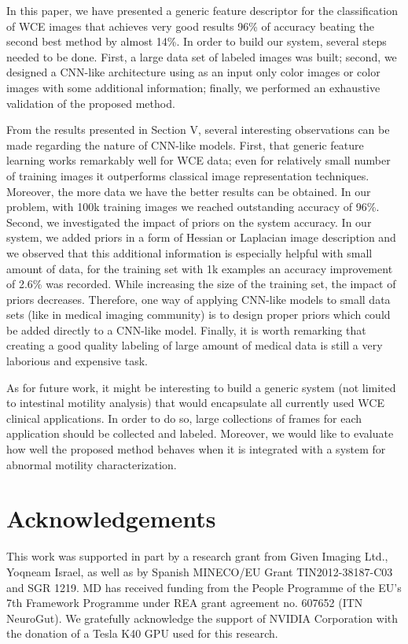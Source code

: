 \documentclass[review,12pt,3p]{elsarticle}
\begin{document}
In this paper, we have presented a generic feature descriptor for the classification of WCE images that achieves very good results 96\% of accuracy beating the second best method by almost 14\%. In order to build our system, several steps needed to be done. First, a large data set of labeled images was built; second, we designed a CNN-like architecture using as an input only color images or color images with some additional information; finally, we performed an exhaustive validation of the proposed method. 

From the results presented in Section V, several interesting observations can be made regarding the nature of CNN-like models. First, that generic feature learning works remarkably well for WCE data; even for relatively small number of training images it outperforms classical image representation techniques. Moreover, the more data we have the better results can be obtained. In our problem, with 100k training images we reached outstanding accuracy of 96\%. Second, we investigated the impact of priors on the system accuracy. In our system, we added priors in a form of Hessian or Laplacian image description and we observed that this additional information is especially helpful with small amount of data, for the training set with 1k examples an accuracy improvement of 2.6\% was recorded. While increasing the size of the training set, the impact of priors decreases. Therefore, one way of applying CNN-like models to small data sets (like in medical imaging community) is to design proper priors which could be added directly to a CNN-like model. Finally, it is worth remarking that creating a good quality labeling of large amount of medical data is still a very laborious and expensive task.

As for future work, it might be interesting to build a generic system (not limited to intestinal motility analysis) that would encapsulate all currently used WCE clinical applications. In order to do so, large collections of frames for each application should be collected and labeled. Moreover, we would like to evaluate how well the proposed method behaves when it is integrated with a system for abnormal motility characterization.  



\section*{Acknowledgements}
This work was supported in part by a research grant from
Given Imaging Ltd., Yoqneam Israel, as well as by Spanish
MINECO/EU Grant TIN2012-38187-C03 and SGR 1219. MD has received funding from the People Programme of the EU’s 7th Framework Programme under REA grant agreement no. 607652 (ITN NeuroGut). We gratefully acknowledge the support of NVIDIA Corporation with the donation of a Tesla K40 GPU used for this research.





\end{document}
